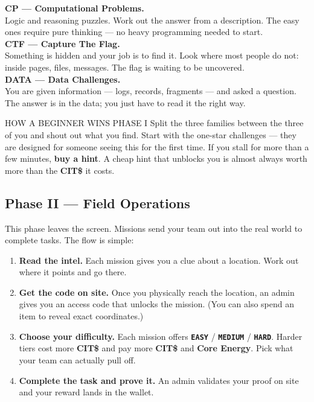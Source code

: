 \documentclass[11pt]{article}
\newcommand{\chip}[2]{{\setlength{\fboxsep}{2pt}\colorbox{#1!18}{\color{#1}\footnotesize\textbf{\texttt{#2}}}}}
\newcommand{\cit}{\textbf{\color{warn}CIT\$}}
\newcommand{\nrg}{\textbf{\color{info}Core Energy}}
\begin{document}
\begin{mypanel}
\textbf{\color{term}CP — Computational Problems.}\\
Logic and reasoning puzzles. Work out the answer from a description. The easy
ones require pure thinking — no heavy programming needed to start.
\\[6pt]
\textbf{\color{info}CTF — Capture The Flag.}\\
Something is hidden and your job is to find it. Look where most people do not:
inside pages, files, messages. The flag is waiting to be uncovered.
\\[6pt]
\textbf{\color{warn}DATA — Data Challenges.}\\
You are given information — logs, records, fragments — and asked a question.
The answer is in the data; you just have to read it the right way.
\end{mypanel}

\begin{infobox}{HOW A BEGINNER WINS PHASE I}
Split the three families between the three of you and shout out what you find.
Start with the one-star challenges — they are designed for someone seeing this
for the first time. If you stall for more than a few minutes, \textbf{buy a
hint}. A cheap hint that unblocks you is almost always worth more than the
\cit{} it costs.
\end{infobox}

\subsection{Phase II — Field Operations}
This phase leaves the screen. Missions send your team out into the real world
to complete tasks. The flow is simple:

\begin{enumerate}
  \item \textbf{Read the intel.} Each mission gives you a clue about a location.
        Work out where it points and go there.
  \item \textbf{Get the code on site.} Once you physically reach the location,
        an admin gives you an access code that unlocks the mission. (You can
        also spend an item to reveal exact coordinates.)
  \item \textbf{Choose your difficulty.} Each mission offers
        \chip{term}{EASY} / \chip{warn}{MEDIUM} / \chip{alert}{HARD}. Harder
        tiers cost more \cit{} and pay more \cit{} and \nrg{}. Pick what your
        team can actually pull off.
  \item \textbf{Complete the task and prove it.} An admin validates your proof
        on site and your reward lands in the wallet.
\end{enumerate}
\end{document}
